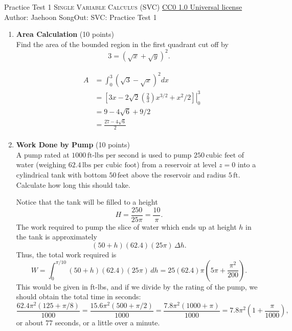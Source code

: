 \handout
{Practice Test 1}
{\textsc{Single Variable Calculus (SVC)}}
{\href{https://creativecommons.org/publicdomain/zero/1.0/}{CC0 1.0 Universal license}}
{Author: Jaehoon Song}{Out: \generatedOn}
{SVC: Practice Test 1}


\begin{enumerate}
  \item \textbf{Area Calculation} (10 points)\\
  Find the area of the bounded region in the first quadrant cut off by 
  \[
  3 = (\sqrt{x} + \sqrt{y})^2.
  \]  
  \begin{subanswer}[red]
    \[
    \begin{aligned}
      &\begin{aligned}
      A & =\int_0^3(\sqrt{3}-\sqrt{x})^2 d x \\
      & =\left.\left[3 x-2 \sqrt{2}\left(\frac{2}{3}\right) x^{3 / 2}+x^2 / 2\right]\right|_0 ^3 \\
      & =9-4 \sqrt{6}+9 / 2 \\
      & =\frac{27-4 \sqrt{6}}{2}
      \end{aligned}
    \end{aligned}
    \]
  \end{subanswer}

  \item \textbf{Work Done by Pump} (10 points)\\
  A pump rated at \(1000 \, \text{ft-lbs per second}\) 
  is used to pump \(250 \, \text{cubic feet}\) of water 
  (weighing \(62.4 \, \text{lbs per cubic foot}\)) from a 
  reservoir at level \(z = 0\) into a cylindrical tank with 
  bottom \(50 \, \text{feet}\) above the reservoir and 
  radius \(5 \, \text{ft}\). Calculate how long this 
  should take.
  \begin{subanswer}[red]
    Notice that the tank will be filled to a height 
    \[
    H = \frac{250}{25\pi} = \frac{10}{\pi}.
    \]
    The work required to pump the slice of water which 
    ends up at height \( h \) in the tank is approximately
    \[
    (50+h)(62.4)(25\pi) \, \Delta h.
    \]
    Thus, the total work required is
    \[
    W = \int_0^{\pi/10} (50+h)(62.4)(25\pi) \, 
    dh = 25(62.4)\pi \left( 5\pi + \frac{\pi^2}{200} \right).
    \]
    This would be given in ft-lbs, and if we divide by 
    the rating of the pump, we should obtain the total 
    time in seconds:
    \[
    \frac{62.4\pi^2(125+\pi/8)}{1000} = 
    \frac{15.6\pi^2(500+\pi/2)}{1000} = 
    \frac{7.8\pi^2(1000+\pi)}{1000} = 
    7.8\pi^2\left(1+\frac{\pi}{1000}\right),
    \]
    or about 77 seconds, or a little over a minute.
  \end{subanswer}




\end{enumerate}
